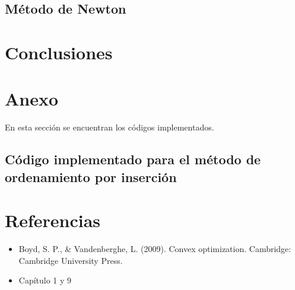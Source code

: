 \documentclass[]{article}
\providecommand{\tightlist}{%
  \setlength{\itemsep}{0pt}\setlength{\parskip}{0pt}}
\begin{document}
\subsection{Método de Newton}

\newpage

\section{Conclusiones}

\newpage

\section{Anexo}

En esta sección se encuentran los códigos implementados.

\subsection{Código implementado para el método de ordenamiento por inserción}

\newpage

\section{Referencias}

\begin{itemize}
\tightlist
\item
  Boyd, S. P., \& Vandenberghe, L. (2009). Convex optimization.
  Cambridge: Cambridge University Press.\\
\item
  Capítulo 1 y 9
\end{itemize}
\end{document}
